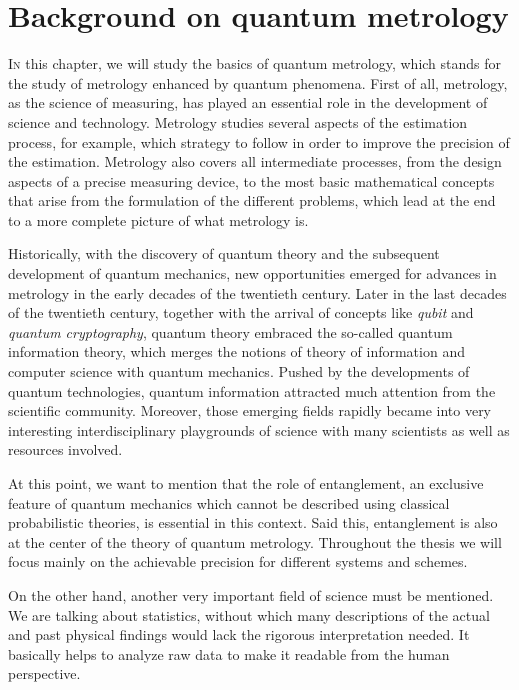 \section[Backgroud on quantum metrology]
{Background on quantum metrology}



\vspace{0pt}
\lettrine[lines=2, findent=3pt,nindent=0pt]{I}{n} this chapter, we will study the basics of quantum metrology, which stands for the study of metrology enhanced by quantum phenomena.
First of all, metrology, as the science of measuring, has played an essential role in the development of science and technology.
Metrology studies several aspects of the estimation process, for example, which strategy to follow in order to improve the precision of the estimation.
Metrology also covers all intermediate processes, from the design aspects of a precise measuring device, to the most basic mathematical concepts that arise from the formulation of the different problems, which lead at the end to a more complete picture of what metrology is.

Historically, with the discovery of quantum theory and the subsequent development of quantum mechanics, new opportunities emerged for advances in metrology in the early decades of the twentieth century.
Later in the last decades of the twentieth century, together with the arrival of concepts like \emph{qubit} and \emph{quantum cryptography}, quantum theory embraced the so-called quantum information theory, which merges the notions of theory of information and computer science with quantum mechanics.
Pushed by the developments of quantum technologies, quantum information attracted much attention from the scientific community.
Moreover, those emerging fields rapidly became into very interesting interdisciplinary playgrounds of science with many scientists as well as resources involved.

At this point, we want to mention that the role of entanglement, an exclusive feature of quantum mechanics which cannot be described using classical probabilistic theories, is essential in this context.
Said this, entanglement is also at the center of the theory of quantum metrology.
Throughout the thesis we will focus mainly on the achievable precision for different systems and schemes.

On the other hand, another very important field of science must be mentioned.
We are talking about statistics, without which many descriptions of the actual and past physical findings would lack the rigorous interpretation needed.
It basically helps to analyze raw data to make it readable from the human perspective.

